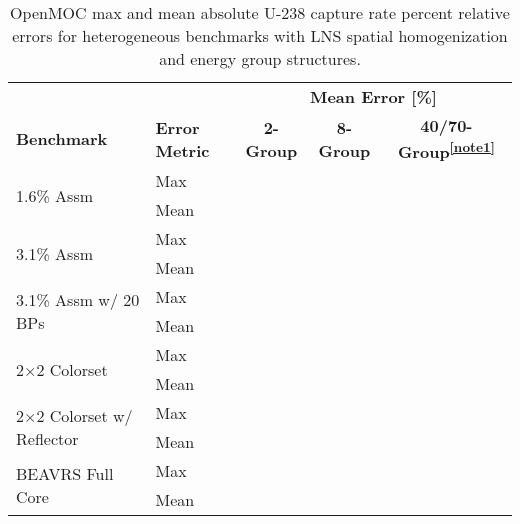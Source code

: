 \begin{table}[ht!]
  \centering
  \caption[OpenMOC U-238 capture rate errors with LNS homogenization]{OpenMOC max and mean absolute U-238 capture rate percent relative errors for heterogeneous benchmarks with \ac{LNS} spatial homogenization and energy group structures.}
  \small
  \label{table:chap9-lns-capture-rates}
  \vspace{6pt}
  \begin{tabular}{l l c c c}
  \toprule
  \rowcolor{lightgray}
  & & \multicolumn{3}{c}{\cellcolor{lightgray} \textbf{Mean Error [\%]}} \\
  \multirow{-2}{*}{\cellcolor{lightgray} \bf Benchmark} &
  \multirow{-2}{*}{\cellcolor{lightgray} \bf Error Metric} &
  \multicolumn{1}{c}{{\cellcolor{lightgray} \bf 2-Group}} &
  \multicolumn{1}{c}{{\cellcolor{lightgray} \bf 8-Group}} &
  \multicolumn{1}{c}{{\cellcolor{lightgray} \bf 40/70-Group\textsuperscript{\ref{note1}}}} \\
  \midrule
\multirow{2}{*}{\parbox{2.5cm}{1.6\% Assm}} & Max & & & \\
& Mean & & & \\
\midrule
\multirow{2}{*}{\parbox{2.5cm}{3.1\% Assm}} & Max & & & \\
& Mean & & & \\
\midrule
\multirow{2}{*}{\parbox{2.5cm}{3.1\% Assm w/ 20 BPs}} & Max & & & \\
& Mean & & & \\
\midrule
\multirow{2}{*}{\parbox{2.5cm}{2$\times$2 Colorset}} & Max & & & \\
& Mean & & & \\
\midrule
\multirow{2}{*}{\parbox{2.5cm}{2$\times$2 Colorset w/ Reflector}} & Max & & & \\
& Mean & & & \\
\midrule
\multirow{2}{*}{\parbox{2.5cm}{BEAVRS Full Core}} & Max & & & \\
& Mean & & & \\
\bottomrule
\end{tabular}
\end{table}
